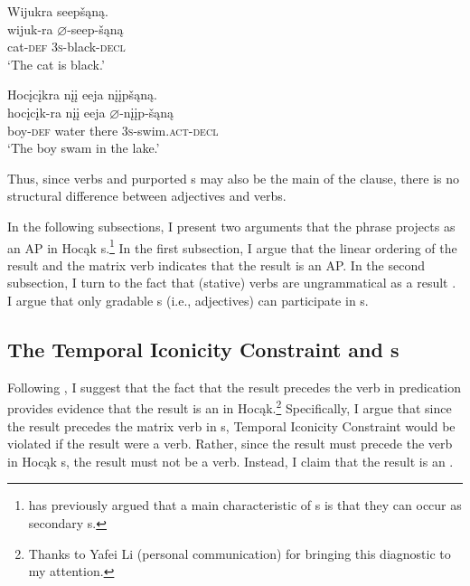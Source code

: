 \documentclass[output=paper]{LSP/langsci}
\begin{document}
\begin{exe}
\ex\label{ex:rosen:31}
\begin{xlist}

\ex \glll Wijukra seepšąną. \\
wijuk-ra {$\varnothing$}-seep-šąną\\
cat-\textsc{def} \textsc{3s}-black-\textsc{decl}\\
\glt `The cat is black.'


\ex \glll Hocįcįkra nįį eeja nįįpšąną.\\
hocįcįk-ra nįį eeja {$\varnothing$}-nįįp-šąną\\
boy-\textsc{def} water there \textsc{3s}-swim.\textsc{act}-\textsc{decl}\\
\glt `The boy swam in the lake.'

\end{xlist}
\end{exe}


Thus, since verbs and purported s may also be the main  of the clause, there is no structural difference between adjectives and verbs.

 
In the following subsections, I present two arguments that the  phrase projects as an AP in Hocąk s.\footnote{\citet{Baker2003} has previously argued that a main characteristic of s is that they can occur as secondary  s.} In the first subsection, I argue that the linear ordering of the result and the matrix verb indicates that the result is an AP. In the second subsection, I turn to the fact that (stative) verbs are ungrammatical as a result . I argue that only gradable s (i.e., adjectives) can participate in s. 
 

\subsection{The Temporal Iconicity Constraint and s}
 
Following \citet{Li1993}, I suggest that the fact that the result precedes the verb in  predication provides evidence that the result is an  in Hocąk.\footnote{Thanks to Yafei Li (personal communication) for bringing this diagnostic to my attention.} Specifically, I argue that since the result precedes the matrix verb in s,  Temporal Iconicity Constraint would be violated if the result were a verb. Rather, since the result must precede the verb in Hocąk s, the result must not be a verb. Instead, I claim that the result is an .
 
\end{document}
